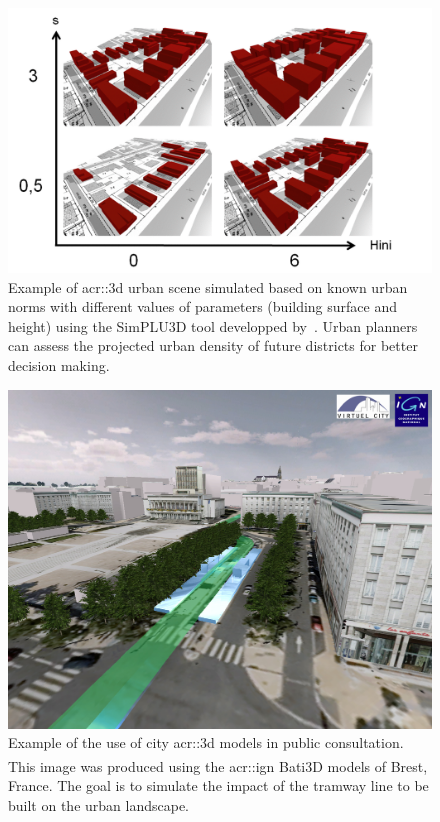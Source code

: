             \begin{figure}[htpb]
                \centering
                \includegraphics[width=\textwidth]{images/introduction/3d_model_applications/simplu}
                \caption{
                    \label{fig::3d_simulation} Example of \gls{acr::3d} urban scene simulated based on known urban norms with different values of parameters (building surface and height) using the SimPLU3D tool developped by~\textcite{brasebin2017stochastic}.
                    Urban planners can assess the projected urban density of future districts for better decision making.
                }
            \end{figure}
            \begin{figure}[htpb]
                \centering
                \includegraphics[width=\textwidth]{images/introduction/3d_model_applications/brest_tramway}
                \caption{
                    \label{fig::public_consultation} Example of the use of city \gls{acr::3d} models in public consultation.
                    This image was produced using the \gls{acr::ign} Bati3D\textsuperscript{\textregistered} models of Brest, France.
                    The goal is to simulate the impact of the tramway line to be built on the urban landscape.
                }
            \end{figure}
